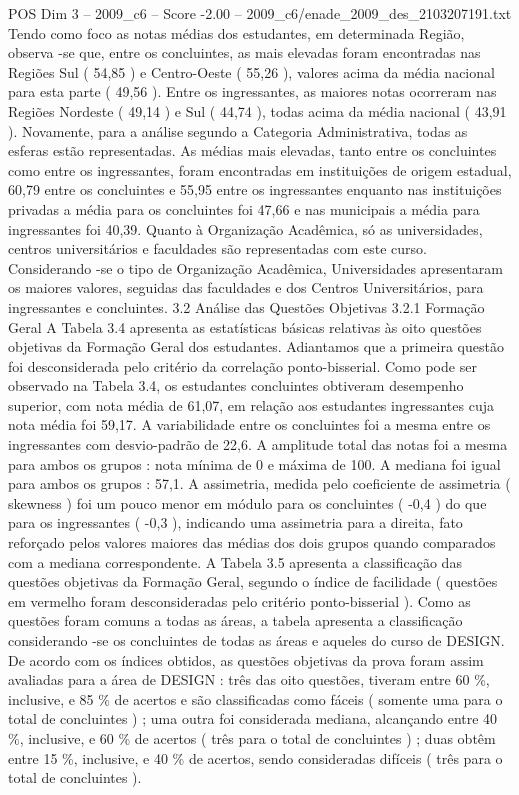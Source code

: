 \begin{textsample}{POS Dim 3 – 2009\_c6 – Score -2.00 – 2009\_c6/enade\_2009\_des\_2103207191.txt}
Tendo como foco as notas médias dos estudantes, em determinada Região, observa -se que, entre os concluintes, as mais elevadas foram encontradas nas Regiões Sul ( 54,85 ) e Centro-Oeste ( 55,26 ), valores acima da média nacional para esta parte ( 49,56 ).
Entre os ingressantes, as maiores notas ocorreram nas Regiões Nordeste ( 49,14 ) e Sul ( 44,74 ), todas acima da média nacional ( 43,91 ).
Novamente, para a análise segundo a Categoria Administrativa, todas as esferas estão representadas.
As médias mais elevadas, tanto entre os concluintes como entre os ingressantes, foram encontradas em instituições de origem estadual, 60,79 entre os concluintes e 55,95 entre os ingressantes enquanto nas instituições privadas a média para os concluintes foi 47,66 e nas municipais a média para ingressantes foi 40,39.
Quanto à Organização Acadêmica, só as universidades, centros universitários e faculdades são representadas com este curso.
Considerando -se o tipo de Organização Acadêmica, Universidades apresentaram os maiores valores, seguidas das faculdades e dos Centros Universitários, para ingressantes e concluintes. 3.2 Análise das Questões Objetivas 3.2.1 Formação Geral A Tabela 3.4 apresenta as estatísticas básicas relativas às oito questões objetivas da Formação Geral dos estudantes.
Adiantamos que a primeira questão foi desconsiderada pelo critério da correlação ponto-bisserial.
Como pode ser observado na Tabela 3.4, os estudantes concluintes obtiveram desempenho superior, com nota média de 61,07, em relação aos estudantes ingressantes cuja nota média foi 59,17.
A variabilidade entre os concluintes foi a mesma entre os ingressantes com desvio-padrão de 22,6.
A amplitude total das notas foi a mesma para ambos os grupos : nota mínima de 0 e máxima de 100.
A mediana foi igual para ambos os grupos : 57,1.
A assimetria, medida pelo coeficiente de assimetria ( skewness ) foi um pouco menor em módulo para os concluintes ( -0,4 ) do que para os ingressantes ( -0,3 ), indicando uma assimetria para a direita, fato reforçado pelos valores maiores das médias dos dois grupos quando comparados com a mediana correspondente.
A Tabela 3.5 apresenta a classificação das questões objetivas da Formação Geral, segundo o índice de facilidade ( questões em vermelho foram desconsideradas pelo critério ponto-bisserial ).
Como as questões foram comuns a todas as áreas, a tabela apresenta a classificação considerando -se os concluintes de todas as áreas e aqueles do curso de DESIGN.
De acordo com os índices obtidos, as questões objetivas da prova foram assim avaliadas para a área de DESIGN : três das oito questões, tiveram entre 60 \%, inclusive, e 85 \% de acertos e são classificadas como fáceis ( somente uma para o total de concluintes ) ; uma outra foi considerada mediana, alcançando entre 40 \%, inclusive, e 60 \% de acertos ( três para o total de concluintes ) ; duas obtêm entre 15 \%, inclusive, e 40 \% de acertos, sendo consideradas difíceis ( três para o total de concluintes ).

\end{textsample}
